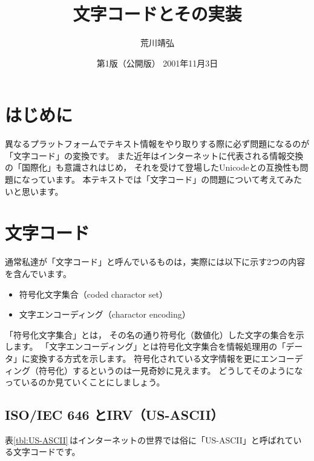 \documentclass[a4j,10pt,fleqn]{jsarticle}
\title{\textbf{文字コードとその実装}}
\author{荒川靖弘}
\date{第1版（公開版） 2001年11月3日}
\begin{document}
\maketitle

\tableofcontents


\clearpage
\section{はじめに}

異なるプラットフォームでテキスト情報をやり取りする際に必ず問題になるのが
「文字コード」の変換です。
また近年はインターネットに代表される情報交換の「国際化」も意識されはじめ，
それを受けて登場したUnicodeとの互換性も問題になっています。
本テキストでは「文字コード」の問題について考えてみたいと思います。


\section{文字コード}

通常私達が「文字コード」と呼んでいるものは，実際には以下に示す2つの内容を含んでいます。
\begin{itemize}
\item 符号化文字集合（coded charactor set）
\item 文字エンコーディング（charactor encoding）
\end{itemize}
「符号化文字集合」とは，
その名の通り符号化（数値化）した文字の集合を示します。
「文字エンコーディング」とは符号化文字集合を情報処理用の「データ」に変換する方式を示します。
符号化されている文字情報を更にエンコーディング（符号化）するというのは一見奇妙に見えます。
どうしてそのようになっているのか見ていくことにしましょう。

\subsection{ISO/IEC 646 とIRV（US-ASCII）}

表\ref{tbl:US-ASCII}\,はインターネットの世界では俗に「US-ASCII」と呼ばれている文字コードです。
\end{document}
